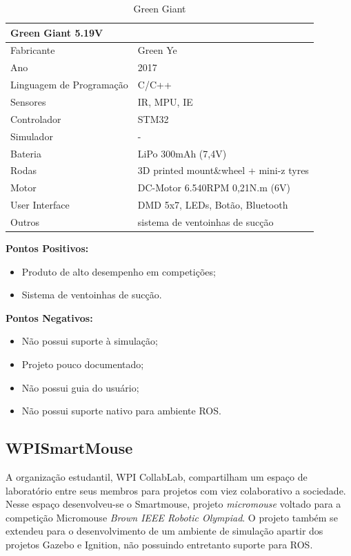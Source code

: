 \begin{table}[H]
	\centering
	\begin{tabular}{|l|l|}
		\hline
		\multicolumn{2}{|l|}{\textbf{Green Giant 5.19V}} \\ \hline
		Fabricante & Green Ye \\ \hline
		Ano & 2017 \\ \hline
		Linguagem de Programação & C/C++ \\ \hline
		Sensores & IR, MPU, IE \\ \hline
		Controlador & STM32 \\ \hline
		Simulador & - \\ \hline
		Bateria & LiPo 300mAh (7,4V) \\ \hline
		Rodas & 3D printed mount\&wheel + mini-z tyres \\ \hline
		Motor & DC-Motor 6.540RPM 0,21N.m (6V) \\ \hline
		User Interface & DMD 5x7, LEDs, Botão, Bluetooth \\ \hline
		Outros & sistema de ventoinhas de sucção \\ \hline
	\end{tabular}
	\caption{{\label{tab:Green_Giant}Green Giant}}
\end{table}


\textbf{Pontos Positivos:}
\begin{itemize}
	\item Produto de alto desempenho em competições;
	\item Sistema de ventoinhas de sucção.
\end{itemize}


\textbf{Pontos Negativos:}
\begin{itemize}
	\item Não possui suporte à simulação;
	\item Projeto pouco documentado;
	\item Não possui guia do usuário;
	\item Não possui suporte nativo para ambiente ROS.
\end{itemize}


\subsection{WPISmartMouse}
\hspace{0.5cm} A organização estudantil, WPI CollabLab, compartilham um espaço de laboratório entre seus membros para projetos com viez colaborativo a sociedade. Nesse espaço desenvolveu-se o Smartmouse, projeto \textit{micromouse} voltado para a competição Micromouse \textit{Brown IEEE Robotic  Olympiad}. O projeto também se extendeu para o desenvolvimento de um ambiente de simulação apartir dos projetos Gazebo e Ignition, não possuindo entretanto suporte para ROS.

